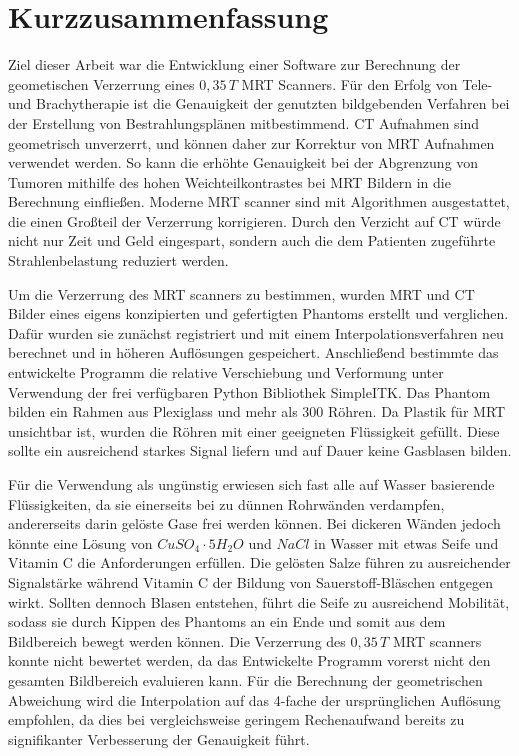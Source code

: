 

\chapter*{Kurzzusammenfassung} 
Ziel dieser Arbeit war die Entwicklung einer Software zur Berechnung der geometischen Verzerrung eines $0,35\, T$ MRT Scanners.
Für den Erfolg von Tele- und Brachytherapie ist die Genauigkeit der genutzten bildgebenden Verfahren bei der Erstellung von Bestrahlungsplänen mitbestimmend.
CT Aufnahmen sind geometrisch unverzerrt, und können daher zur Korrektur von MRT Aufnahmen verwendet werden.
So kann die erhöhte Genauigkeit bei der Abgrenzung von Tumoren mithilfe des hohen Weichteilkontrastes bei MRT Bildern in die Berechnung einfließen.
Moderne MRT scanner sind mit Algorithmen ausgestattet, die einen Großteil der Verzerrung korrigieren.
Durch den Verzicht auf CT würde nicht nur Zeit und Geld eingespart, sondern auch die dem Patienten zugeführte Strahlenbelastung reduziert werden.

Um die Verzerrung des MRT scanners zu bestimmen, wurden MRT und CT Bilder eines eigens konzipierten und gefertigten Phantoms erstellt und verglichen.
Dafür wurden sie zunächst registriert und mit einem Interpolationsverfahren neu berechnet und in höheren Auflösungen gespeichert.
Anschließend bestimmte das entwickelte Programm die relative Verschiebung und Verformung unter Verwendung der frei verfügbaren Python Bibliothek {SimpleITK}.
Das Phantom bilden ein Rahmen aus Plexiglass und mehr als 300 Röhren.
Da Plastik für MRT unsichtbar ist, wurden die Röhren mit einer geeigneten Flüssigkeit gefüllt.
Diese sollte ein ausreichend starkes Signal liefern und auf Dauer keine Gasblasen bilden.

Für die Verwendung als ungünstig erwiesen sich fast alle auf Wasser basierende Flüssigkeiten, da sie einerseits bei zu dünnen Rohrwänden verdampfen, andererseits darin gelöste Gase frei werden können.
Bei dickeren Wänden jedoch könnte eine Lösung von $CuSO_4\cdot5H_2O$ und $NaCl$ in Wasser mit etwas Seife und Vitamin C die Anforderungen erfüllen. Die gelösten Salze führen zu ausreichender Signalstärke während Vitamin C der Bildung von Sauerstoff-Bläschen entgegen wirkt.
Sollten dennoch Blasen entstehen, führt die Seife zu ausreichend Mobilität, sodass sie durch Kippen des Phantoms an ein Ende und somit aus dem Bildbereich bewegt werden können.
Die Verzerrung des $0,35\, T$ MRT scanners konnte nicht bewertet werden, da das Entwickelte Programm vorerst nicht den gesamten Bildbereich evaluieren kann.
Für die Berechnung der geometrischen Abweichung wird die Interpolation auf das 4-fache der ursprünglichen Auflösung empfohlen, da dies bei vergleichsweise geringem Rechenaufwand bereits zu signifikanter Verbesserung der Genauigkeit führt.

